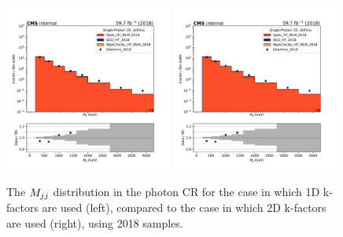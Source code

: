 \begin{figure}
    \begin{center}
        \includegraphics[width=0.49\textwidth]{fig/datamc/cr_g_vbf/cr_g_vbf_mjj_losf_2018.pdf}
        \includegraphics[width=0.49\textwidth]{fig/datamc_2dkfac/cr_g_vbf/cr_g_vbf_mjj_losf_2018.pdf} 
        \caption{The $M_{jj}$ distribution in the photon CR for the case in which 1D k-factors are used (left), 
        compared to the case in which 2D k-factors are used (right), using 2018 samples.}
        \label{fig:mjj_2018}
    \end{center}
\end{figure}

